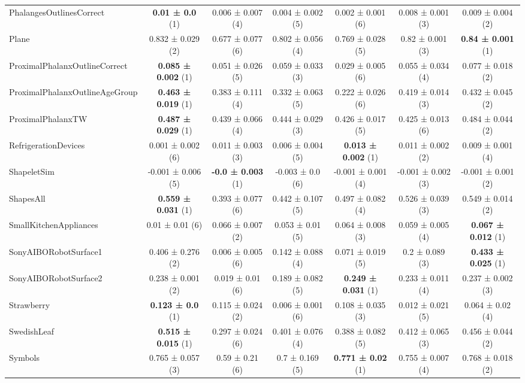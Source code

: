 \begin{table}[ht]
\begin{adjustbox}{width=\textwidth}
\begin{tabular}{lcccccc}
    PhalangesOutlinesCorrect & \textbf{0.01 ± 0.0} (1) & 0.006 ± 0.007 (4) & 0.004 ± 0.002 (5) & 0.002 ± 0.001 (6) & 0.008 ± 0.001 (3) & 0.009 ± 0.004 (2) \\
    Plane & 0.832 ± 0.029 (2) & 0.677 ± 0.077 (6) & 0.802 ± 0.056 (4) & 0.769 ± 0.028 (5) & 0.82 ± 0.001 (3) & \textbf{0.84 ± 0.001} (1) \\
    ProximalPhalanxOutlineCorrect & \textbf{0.085 ± 0.002} (1) & 0.051 ± 0.026 (5) & 0.059 ± 0.033 (3) & 0.029 ± 0.005 (6) & 0.055 ± 0.034 (4) & 0.077 ± 0.018 (2) \\
    ProximalPhalanxOutlineAgeGroup & \textbf{0.463 ± 0.019} (1) & 0.383 ± 0.111 (4) & 0.332 ± 0.063 (5) & 0.222 ± 0.026 (6) & 0.419 ± 0.014 (3) & 0.432 ± 0.045 (2) \\
    ProximalPhalanxTW & \textbf{0.487 ± 0.029} (1) & 0.439 ± 0.066 (4) & 0.444 ± 0.029 (3) & 0.426 ± 0.017 (5) & 0.425 ± 0.013 (6) & 0.484 ± 0.044 (2) \\
    RefrigerationDevices & 0.001 ± 0.002 (6) & 0.011 ± 0.003 (3) & 0.006 ± 0.004 (5) & \textbf{0.013 ± 0.002} (1) & 0.011 ± 0.002 (2) & 0.009 ± 0.001 (4) \\
    ShapeletSim & -0.001 ± 0.006 (5) & \textbf{-0.0 ± 0.003} (1) & -0.003 ± 0.0 (6) & -0.001 ± 0.001 (4) & -0.001 ± 0.002 (3) & -0.001 ± 0.001 (2) \\
    ShapesAll & \textbf{0.559 ± 0.031} (1) & 0.393 ± 0.077 (6) & 0.442 ± 0.107 (5) & 0.497 ± 0.082 (4) & 0.526 ± 0.039 (3) & 0.549 ± 0.014 (2) \\
    SmallKitchenAppliances & 0.01 ± 0.01 (6) & 0.066 ± 0.007 (2) & 0.053 ± 0.01 (5) & 0.064 ± 0.008 (3) & 0.059 ± 0.005 (4) & \textbf{0.067 ± 0.012} (1) \\
    SonyAIBORobotSurface1 & 0.406 ± 0.276 (2) & 0.006 ± 0.005 (6) & 0.142 ± 0.088 (4) & 0.071 ± 0.019 (5) & 0.2 ± 0.089 (3) & \textbf{0.433 ± 0.025} (1) \\
    SonyAIBORobotSurface2 & 0.238 ± 0.001 (2) & 0.019 ± 0.01 (6) & 0.189 ± 0.082 (5) & \textbf{0.249 ± 0.031} (1) & 0.233 ± 0.011 (4) & 0.237 ± 0.002 (3) \\
    Strawberry & \textbf{0.123 ± 0.0} (1) & 0.115 ± 0.024 (2) & 0.006 ± 0.001 (6) & 0.108 ± 0.035 (3) & 0.012 ± 0.021 (5) & 0.064 ± 0.02 (4) \\
    SwedishLeaf & \textbf{0.515 ± 0.015} (1) & 0.297 ± 0.024 (6) & 0.401 ± 0.076 (4) & 0.388 ± 0.082 (5) & 0.412 ± 0.065 (3) & 0.456 ± 0.044 (2) \\
    Symbols & 0.765 ± 0.057 (3) & 0.59 ± 0.21 (6) & 0.7 ± 0.169 (5) & \textbf{0.771 ± 0.02} (1) & 0.755 ± 0.007 (4) & 0.768 ± 0.018 (2) \\

\end{tabular}
\end{adjustbox}
\end{table}
